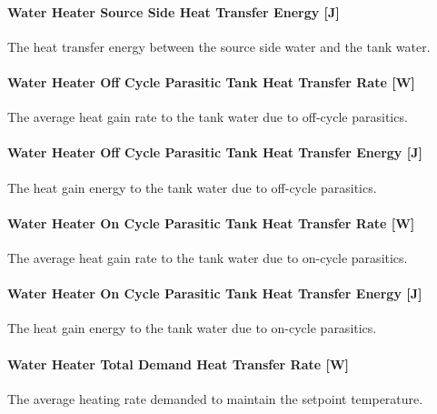 \paragraph{Water Heater Source Side Heat Transfer Energy {[}J{]}}\label{water-heater-source-side-heat-transfer-energy-j}

The heat transfer energy between the source side water and the tank water.

\paragraph{Water Heater Off Cycle Parasitic Tank Heat Transfer Rate {[}W{]}}\label{water-heater-off-cycle-parasitic-tank-heat-transfer-rate-w}

The average heat gain rate to the tank water due to off-cycle parasitics.

\paragraph{Water Heater Off Cycle Parasitic Tank Heat Transfer Energy {[}J{]}}\label{water-heater-off-cycle-parasitic-tank-heat-transfer-energy-j}

The heat gain energy to the tank water due to off-cycle parasitics.

\paragraph{Water Heater On Cycle Parasitic Tank Heat Transfer Rate {[}W{]}}\label{water-heater-on-cycle-parasitic-tank-heat-transfer-rate-w}

The average heat gain rate to the tank water due to on-cycle parasitics.

\paragraph{Water Heater On Cycle Parasitic Tank Heat Transfer Energy {[}J{]}}\label{water-heater-on-cycle-parasitic-tank-heat-transfer-energy-j}

The heat gain energy to the tank water due to on-cycle parasitics.

\paragraph{Water Heater Total Demand Heat Transfer Rate {[}W{]}}\label{water-heater-total-demand-heat-transfer-rate-w}

The average heating rate demanded to maintain the setpoint temperature.

